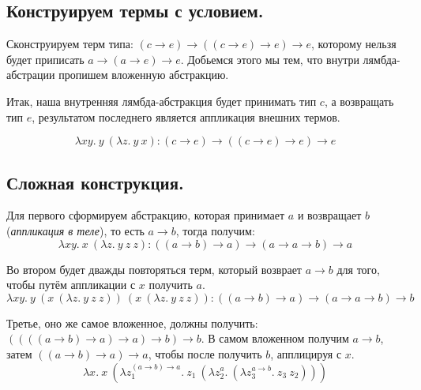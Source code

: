 \documentclass[a4paper,12pt]{article}
\theoremstyle{plain} %
\theoremstyle{definition} %
\theoremstyle{remark} %
\begin{document}
\subsection{Конструируем термы с условием.}

Сконструируем терм типа: $(c \rightarrow e) \rightarrow ((c \rightarrow e) \rightarrow e) \rightarrow e$, которому нельзя будет приписать $a \rightarrow (a \rightarrow e) \rightarrow e$. Добьемся этого мы тем, что внутри лямбда-абстрации пропишем вложенную абстракцию. 

Итак, наша внутренняя лямбда-абстракция будет принимать тип $c$, а возвращать тип $e$, результатом последнего является аппликация внешних термов.

$$\lambda x y. \ y \ (\lambda z. \ y \ x) : (c \rightarrow e) \rightarrow ((c \rightarrow e) \rightarrow e) \rightarrow e$$


\subsection{Сложная конструкция.}
Для первого сформируем абстракцию, которая принимает $a$ и возвращает $b$ (\textit{аппликация в теле}), то есть $a \rightarrow b$, тогда получим:
$$\lambda x y. \ x \ (\lambda z. \ y \ z \ z) : ((a \rightarrow b) \rightarrow a) \rightarrow (a \rightarrow a \rightarrow b) \rightarrow a$$

Во втором будет дважды повторяться терм, который возврает $a \rightarrow b$ для того, чтобы путём аппликации с $x$ получить $a$.
$$\lambda xy. \ y \ (x \ (\lambda z. \ y \ z \ z)) \ (x \ (\lambda z. \ y \ z \ z)) : ((a \rightarrow b) \rightarrow a) \rightarrow (a \rightarrow a \rightarrow b) \rightarrow b$$

Третье, оно же самое вложенное, должны получить: $((((a \rightarrow b) \rightarrow a) \rightarrow a) \rightarrow b) \rightarrow b$. В самом вложенном получим $a \rightarrow b$, затем $((a \rightarrow b) \rightarrow a) \rightarrow a$, чтобы после получить $b$, апплицируя с $x$.
$$\lambda x. \ x \ (\lambda z_1^{(a \rightarrow b) \rightarrow a}. \ z_1 \ (\lambda z_2^{a}. \ (\lambda z_3^{a \rightarrow b}. \ z_3 \ z_2)))$$
\end{document}
